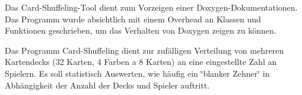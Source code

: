 \begin{DoxyParagraph}{}
Das Card-\/\-Shuffeling-\/\-Tool dient zum Vorzeigen einer Doxygen-\/\-Dokumentationen. Das Programm wurde absichtlich mit einem Overhead an Klassen und Funktionen geschrieben, um das Verhalten von Doxygen zeigen zu können. 
\end{DoxyParagraph}
\begin{DoxyParagraph}{}
Das Programm Card-\/\-Shuffeling dient zur zufälligen Verteilung von mehreren Kartendecks (32 Karten, 4 Farben a 8 Karten) an eine eingestellte Zahl an Spielern. Es soll statistisch Auswerten, wie häufig ein \char`\"{}blanker Zehner\char`\"{} in Abhängigkeit der Anzahl der Decks und Spieler auftritt. 
\end{DoxyParagraph}
